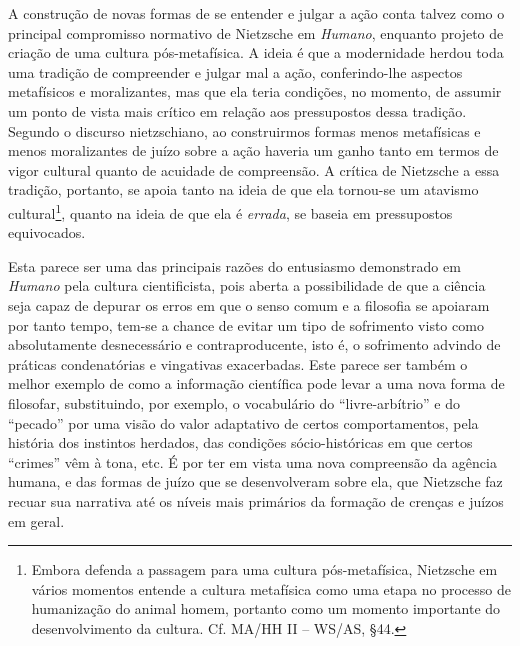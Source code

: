 \documentclass[
	12pt,				%
	openright,			%
	oneside,			%
	a4paper,			%
	english,			%
	french,				%
	spanish,			%
	brazil				%
	]{abntex2}
\begin{document}
A construção de novas formas de se entender e julgar a ação conta talvez como o principal compromisso normativo de Nietzsche em \textit{Humano}, enquanto projeto de criação de uma cultura pós-metafísica. A ideia é que a modernidade herdou toda uma tradição de compreender e julgar mal a ação, conferindo-lhe aspectos metafísicos e moralizantes, mas que ela teria condições, no momento, de assumir um ponto de vista mais crítico em relação aos pressupostos dessa tradição. Segundo o discurso nietzschiano, ao construirmos formas menos metafísicas e menos moralizantes de juízo sobre a ação haveria um ganho tanto em termos de vigor cultural quanto de acuidade de compreensão. A crítica de Nietzsche a essa tradição, portanto, se apoia tanto na ideia de que ela tornou-se um atavismo cultural\footnote{Embora defenda a passagem para uma cultura pós-metafísica, Nietzsche em vários momentos entende a cultura metafísica como uma etapa no processo de humanização do animal homem, portanto como um momento importante do desenvolvimento da cultura. Cf. MA/HH II – WS/AS, §44.}, quanto na ideia de que ela é \textit{errada}, se baseia em pressupostos equivocados. 

Esta parece ser uma das principais razões do entusiasmo demonstrado em \textit{Humano} pela cultura cientificista, pois aberta a possibilidade de que a ciência seja capaz de depurar os erros em que o senso comum e a filosofia se apoiaram por tanto tempo, tem-se a chance de evitar um tipo de sofrimento visto como absolutamente desnecessário e contraproducente, isto é, o sofrimento advindo de práticas condenatórias e vingativas exacerbadas. Este parece ser também o melhor exemplo de como a informação científica pode levar a uma nova forma de filosofar, substituindo, por exemplo, o vocabulário do “livre-arbítrio” e do “pecado” por uma visão do valor adaptativo de certos comportamentos, pela história dos instintos herdados, das condições sócio-históricas em que certos “crimes” vêm à tona, etc. É por ter em vista uma nova compreensão da agência humana, e das formas de juízo que se desenvolveram sobre ela, que Nietzsche faz recuar sua narrativa até os níveis mais primários da formação de crenças e juízos em geral.
\end{document}
